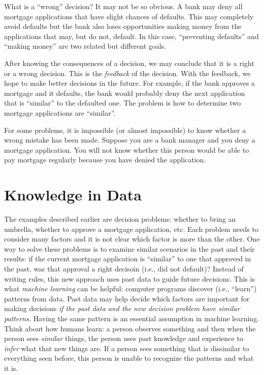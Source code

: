 What is a ``wrong'' decision? It may not be so obvious.  A bank may
deny all mortgage applications that have slight chances of
defaults. This may completely avoid defaults but the bank also loses
opportunities making money from the applications that may, but do not,
default.  In this case, ``preventing defaults'' and ``making money''
are two related but different goals.

After knowing the consequences of a decision, we may conclude that it
is a right or a wrong decision. This is the {\it feedback} of the
decision.  With the feedback, we hope to make better decisions in the
future. For example, if the bank approves a mortgage and it defaults,
the bank would probably deny the next application that is ``similar''
to the defaulted one.  The problem is how to determine two mortgage
applications are ``similar''.

For some problems, it is impossible (or almost impossible) to know
whether a wrong mistake has been made. Suppose you are a bank manager
and you deny a mortgage application. You will not know whether this
person would be able to pay mortgage regularly because you have denied
the application.



\section{Knowledge in Data}


The examples described earlier are decision problems: whether to bring
an umbrella, whether to approve a mortgage application, etc. Each
problem needs to consider many factors and it is not clear which
factor is more than the other. One way to solve these problems is to
examine similar scenarios in the past and their results: if the
current mortgage application is ``similar'' to one that approved in
the past, was that approval a right decisoin (i.e., did not default)?
Instead of writing rules, this new approach uses past data to guide
future decisions.  This is what {\it machine learning} can be helpful:
computer programs discover (i.e., ``learn'') patterns from data.  Past
data may help decide which factors are important for making decisions
{\it if the past data and the new decision problem have similar
  patterns.}  Having the same pattern is an essential assumption in
machine learning.  Think about how humans learn: a person observes
something and then when the person sees {\it similar} things, the
person uses past knowledge and experience to {\it infer} what that new
things are.  If a person sees something that is dissimilar to
everything seen before, this person is unable to recognize the
patterns and what it is.

